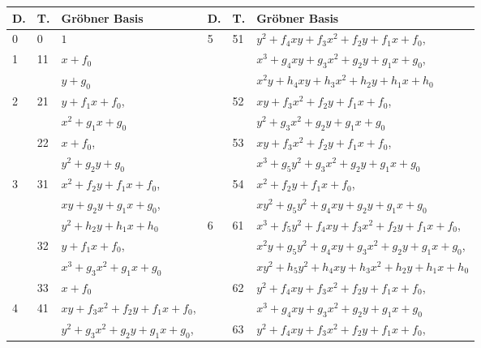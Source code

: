 \begin{center}
\begin{tabular}{l|l|l||l|l|l}
  D. & T. & Gr\"obner Basis & D. & T. & Gr\"obner Basis \\
  \hline
  0 & 0 & $1$ & \multirow{9}{*}{5} &\multirow{3}{*}{51} & $y^2 + f_4xy + f_3x^2 + f_2y + f_1x + f_0$, \\
  \cline{1-3}
  \multirow{2}{*}{1} &\multirow{2}{*}{11} & $x + f_0$ & & & $x^3 + g_4xy + g_3x^2 + g_2y + g_1x + g_0$, \\
    & & $y + g_0$ & & & $x^2y + h_4xy + h_3x^2 + h_2y + h_1x + h_0$ \\
  \cline{1-3}\cline{5-6}
  \multirow{4}{*}{2} &\multirow{2}{*}{21} & $y + f_1x + f_0$, & & \multirow{2}{*}{52} & $xy + f_3x^2 + f_2y + f_1x + f_0$, \\
    & & $x^2 + g_1x + g_0$ & & & $y^2 + g_3x^2 + g_2y + g_1x + g_0$ \\
    \cline{2-3}\cline{5-6}
    &\multirow{2}{*}{22}  & $x + f_0$, & & \multirow{2}{*}{53} & $xy + f_3x^2 + f_2y + f_1x + f_0$, \\
    & & $y^2 + g_2y + g_0$ & & & $x^3 + g_5y^2 + g_3x^2 + g_2y + g_1x + g_0$ \\
  \cline{1-3}\cline{5-6}
  \multirow{6}{*}{3} &\multirow{3}{*}{31} & $x^2 + f_2y + f_1x + f_0$, & & \multirow{2}{*}{54} & $x^2 + f_2y + f_1x + f_0$, \\
    & & $xy + g_2y + g_1x + g_0$, & & & $xy^2 + g_5y^2 + g_4xy + g_2y + g_1x + g_0$ \\
  \cline{4-6}
    & & $y^2 + h_2y + h_1x + h_0$ & \multirow{10}{*}{6} &\multirow{3}{*}{61} & $x^3 + f_5y^2 + f_4xy + f_3x^2 + f_2y + f_1x + f_0$, \\
    \cline{2-3}
    &\multirow{2}{*}{32} & $y + f_1x + f_0$, & & & $x^2y + g_5y^2 + g_4xy + g_3x^2 + g_2y + g_1x + g_0$, \\
    & & $x^3 + g_3x^2 + g_1x + g_0$ & & & $xy^2 + h_5y^2 + h_4xy + h_3x^2 + h_2y + h_1x + h_0$ \\
    \cline{2-3}\cline{5-6}
    &\multirow{1}{*}{33} & $x + f_0$ & &\multirow{2}{*}{62} & $y^2 + f_4xy + f_3x^2 + f_2y + f_1x + f_0$, \\
  \cline{1-3}
  \multirow{8}{*}{4} &\multirow{3}{*}{41} & $xy + f_3x^2 + f_2y + f_1x + f_0$, & & & $x^3 + g_4xy + g_3x^2 + g_2y + g_1x + g_0$ \\
  \cline{5-6}
    & & $y^2 + g_3x^2 + g_2y + g_1x + g_0$, & &\multirow{2}{*}{63} & $y^2 + f_4xy + f_3x^2 + f_2y + f_1x + f_0$, \\

\end{tabular}
\end{center}
